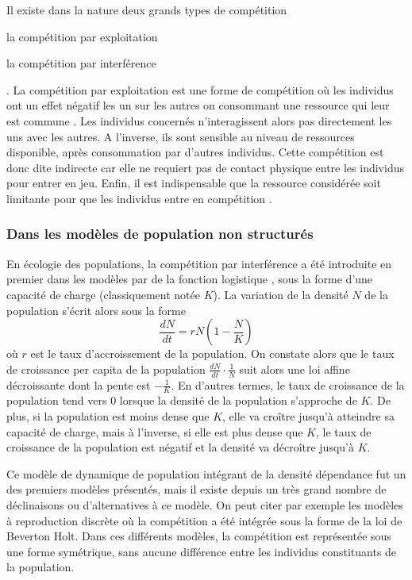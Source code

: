 Il existe dans la nature deux grands types de compétition
\begin{enumerate*}[label=(\roman*), before=\unskip{ : }, itemjoin={{ ; }},
itemjoin*={{ ; et }}] \item la compétition par exploitation \item la compétition
par interférence \end{enumerate*} \autocites{park1954a, park1962a, begon2009a}.
La compétition par exploitation est une forme de compétition où les
individus ont un effet négatif les un sur les autres on consommant une ressource
qui leur est commune \autocites{goss-custard1980a,
vance1984a, begon2009a}. Les individus concernés n'interagissent alors pas directement les
uns avec les autres. A l'inverse, ils sont sensible au niveau de ressources
disponible, après consommation par d'autres individus. Cette compétition est
donc dite indirecte car elle ne requiert pas de contact physique entre les
individus pour entrer en jeu. Enfin, il est indispensable que la ressource
considérée soit limitante pour que les individus entre en compétition
\autocites{begon2009a}. 

\subsubsection{Dans les modèles de population non structurés}

En écologie des populations, la compétition par interférence a été introduite en
premier dans les modèles par de la fonction logistique \autocites{verhulst1838a},
sous la forme d'une capacité de charge (classiquement notée $K$). La variation
de la densité $N$ de la population s'écrit alors sous la forme
$$\frac{dN}{dt}=rN \left(1-\frac{N}{K}\right)$$ où $r$ est le taux
d'accroissement de la population. On constate alors que le taux de croissance
per capita de la population $\frac{dN}{dt}\cdot \frac{1}{N}$ suit alors une loi
affine décroissante dont la pente est $-\frac{1}{K}$. En d'autres termes, le
taux de croissance de la population tend vers 0 lorsque la densité de la
population s'approche de $K$. De plus, si la population est moins dense que $K$,
elle va croître jusqu'à atteindre sa capacité de charge, mais à l'inverse, si
elle est plus dense que $K$, le taux de croissance de la population est négatif
et la densité va décroître jusqu'à $K$.

Ce modèle de dynamique de population intégrant de la densité dépendance fut un
des premiers modèles présentés, mais il existe depuis un très grand nombre de
déclinaisons ou d'alternatives à ce modèle. On peut citer par exemple les
modèles à reproduction discrète où la compétition a été intégrée sous la forme
de la loi de Beverton Holt. Dans ces différents modèles, la compétition est
représentée sous une forme symétrique, sans aucune différence entre les
individus constituants de la population. 


